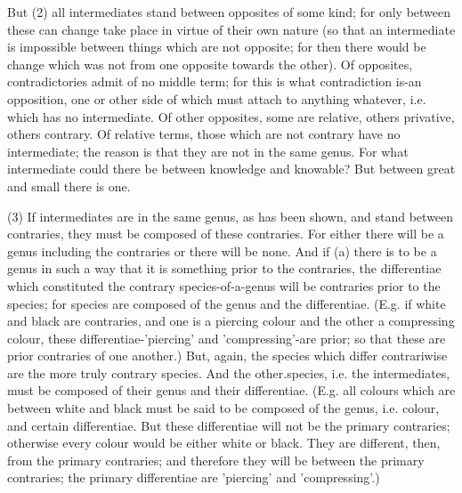 But (2) all intermediates stand between opposites of some kind; for only between these can change take place in virtue of their own nature (so that an intermediate is impossible between things which are not opposite; for then there would be change which was not from one opposite towards the other). Of opposites, contradictories admit of no middle term; for this is what contradiction is-an opposition, one or other side of which must attach to anything whatever, i.e. which has no intermediate. Of other opposites, some are relative, others privative, others contrary. Of relative terms, those which are not contrary have no intermediate; the reason is that they are not in the same genus. For what intermediate could there be between knowledge and knowable? But between great and small there is one.

(3) If intermediates are in the same genus, as has been shown, and stand between contraries, they must be composed of these contraries. For either there will be a genus including the contraries or there will be none. And if (a) there is to be a genus in such a way that it is something prior to the contraries, the differentiae which constituted the contrary species-of-a-genus will be contraries prior to the species; for species are composed of the genus and the differentiae. (E.g. if white and black are contraries, and one is a piercing colour and the other a compressing colour, these differentiae-'piercing' and 'compressing'-are prior; so that these are prior contraries of one another.) But, again, the species which differ contrariwise are the more truly contrary species. And the other.species, i.e. the intermediates, must be composed of their genus and their differentiae. (E.g. all colours which are between white and black must be said to be composed of the genus, i.e. colour, and certain differentiae. But these differentiae will not be the primary contraries; otherwise every colour would be either white or black. They are different, then, from the primary contraries; and therefore they will be between the primary contraries; the primary differentiae are 'piercing' and 'compressing'.)

